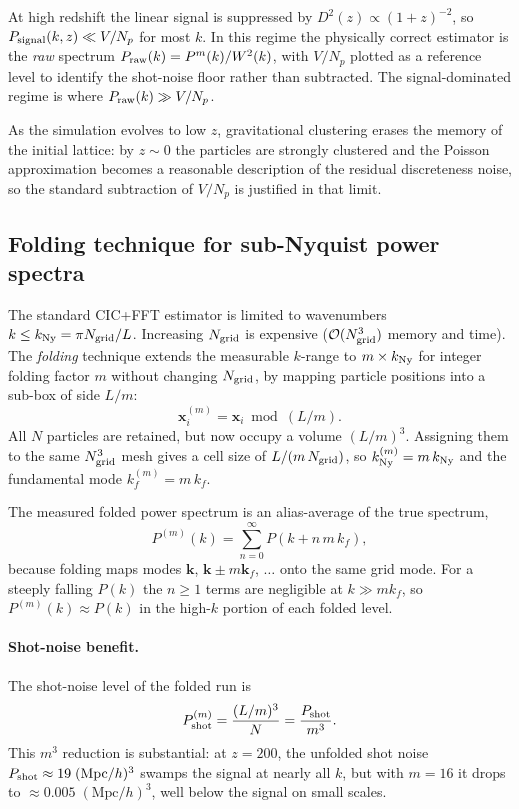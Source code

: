 \documentclass[12pt]{article}
\begin{document}
At high redshift the linear signal is suppressed by $D^2(z)
\propto (1+z)^{-2}$, so $P_{\rm signal}(k,z) \ll V/N_p$ for most
$k$.  In this regime the physically correct estimator is the
\emph{raw} spectrum $P_{\rm raw}(k) = P^m(k)/W^2(k)$, with $V/N_p$
plotted as a reference level to identify the shot-noise floor rather
than subtracted.  The signal-dominated regime is where
$P_{\rm raw}(k) \gg V/N_p$.

As the simulation evolves to low $z$, gravitational clustering erases
the memory of the initial lattice: by $z\sim 0$ the particles are
strongly clustered and the Poisson approximation becomes a reasonable
description of the residual discreteness noise, so the standard
subtraction of $V/N_p$ is justified in that limit.

\subsection{Folding technique for sub-Nyquist power spectra}
\label{sec:folding}

The standard CIC+FFT estimator is limited to wavenumbers
$k \leq k_{\rm Ny} = \pi N_{\rm grid}/L$.  Increasing $N_{\rm grid}$
is expensive ($\mathcal{O}(N_{\rm grid}^3)$ memory and time).  The
\emph{folding} technique \citep{Jenkins1998} extends the measurable
$k$-range to $m\times k_{\rm Ny}$ for integer folding factor $m$
without changing $N_{\rm grid}$, by mapping particle positions into a
sub-box of side $L/m$:
\begin{equation}
  \mathbf{x}^{(m)}_i = \mathbf{x}_i \bmod (L/m).
  \label{eq:fold}
\end{equation}
All $N$ particles are retained, but now occupy a volume $(L/m)^3$.
Assigning them to the same $N_{\rm grid}^3$ mesh gives a cell size of
$L/(m\,N_{\rm grid})$, so $k_{\rm Ny}^{(m)} = m\,k_{\rm Ny}$ and the
fundamental mode $k_f^{(m)} = m\,k_f$.

The measured folded power spectrum is an alias-average of the true
spectrum,
\begin{equation}
  P^{(m)}(k) = \sum_{n=0}^{\infty} P(k + n\,m\,k_f),
  \label{eq:fold_alias}
\end{equation}
because folding maps modes $\mathbf{k}$, $\mathbf{k}\pm m\mathbf{k}_f$,
$\ldots$ onto the same grid mode.  For a steeply falling $P(k)$ the
$n \geq 1$ terms are negligible at $k \gg m k_f$, so $P^{(m)}(k)
\approx P(k)$ in the high-$k$ portion of each folded level.

\paragraph{Shot-noise benefit.}
The shot-noise level of the folded run is
\begin{equation}
  P_{\rm shot}^{(m)} = \frac{(L/m)^3}{N} = \frac{P_{\rm shot}}{m^3}.
  \label{eq:fold_shot}
\end{equation}
This $m^3$ reduction is substantial: at $z=200$, the unfolded shot
noise $P_{\rm shot} \approx 19\;(\mathrm{Mpc}/h)^3$ swamps the signal
at nearly all $k$, but with $m=16$ it drops to
$\approx 0.005\;(\mathrm{Mpc}/h)^3$, well below the signal on small
scales.
\end{document}
